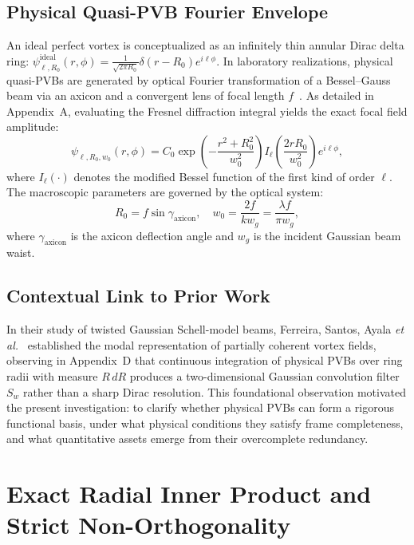 \documentclass{optica-article}
\begin{document}
\subsection{Physical Quasi-PVB Fourier Envelope}

An ideal perfect vortex is conceptualized as an infinitely thin annular Dirac delta ring: $\psi_{\ell, R_0}^{\text{ideal}}(r, \phi) = \frac{1}{\sqrt{2\pi R_0}} \delta(r - R_0) e^{i \ell \phi}$. In laboratory realizations, physical quasi-PVBs are generated by optical Fourier transformation of a Bessel--Gauss beam via an axicon and a convergent lens of focal length $f$~\cite{Vaity2015}. As detailed in Appendix~A, evaluating the Fresnel diffraction integral yields the exact focal field amplitude:
\begin{equation}
\psi_{\ell, R_0, w_0}(r, \phi) = C_0 \exp\left(-\frac{r^2 + R_0^2}{w_0^2}\right) I_\ell\left(\frac{2 r R_0}{w_0^2}\right) e^{i \ell \phi},
\label{eq:pvb_field}
\end{equation}
where $I_\ell(\cdot)$ denotes the modified Bessel function of the first kind of order $\ell$. The macroscopic parameters are governed by the optical system:
\begin{equation}
R_0 = f \sin \gamma_{\text{axicon}}, \quad w_0 = \frac{2 f}{k w_g} = \frac{\lambda f}{\pi w_g},
\end{equation}
where $\gamma_{\text{axicon}}$ is the axicon deflection angle and $w_g$ is the incident Gaussian beam waist.

\subsection{Contextual Link to Prior Work}

In their study of twisted Gaussian Schell-model beams, Ferreira, Santos, Ayala \emph{et al.}~\cite{Ferreira2026} established the modal representation of partially coherent vortex fields, observing in Appendix~D that continuous integration of physical PVBs over ring radii with measure $R \, dR$ produces a two-dimensional Gaussian convolution filter $S_w$ rather than a sharp Dirac resolution. This foundational observation motivated the present investigation: to clarify whether physical PVBs can form a rigorous functional basis, under what physical conditions they satisfy frame completeness, and what quantitative assets emerge from their overcomplete redundancy.

\section{Exact Radial Inner Product and Strict Non-Orthogonality}
\label{sec:inner_product}
\end{document}
